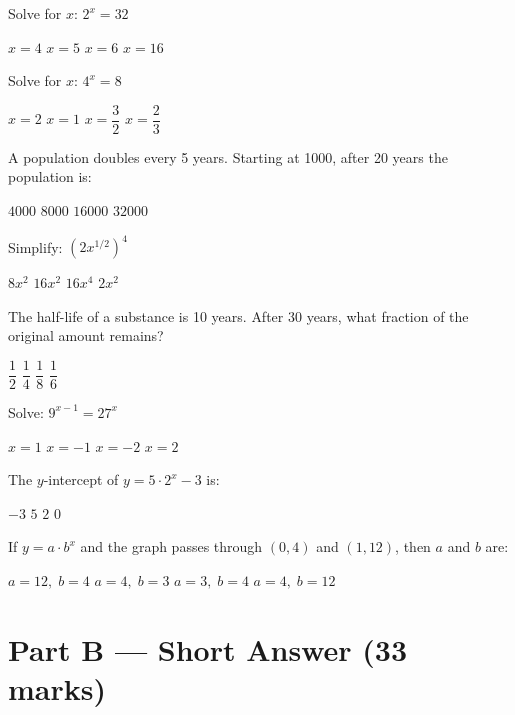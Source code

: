 \documentclass[addpoints]{exam}
\begin{document}
\begin{questions}
\question[1] Solve for $x$: $2^x = 32$
\begin{choices}
    \choice $x = 4$
    \correctchoice $x = 5$
    \choice $x = 6$
    \choice $x = 16$
\end{choices}

\question[1] Solve for $x$: $4^x = 8$
\begin{choices}
    \choice $x = 2$
    \choice $x = 1$
    \correctchoice $x = \dfrac{3}{2}$
    \choice $x = \dfrac{2}{3}$
\end{choices}

\question[1] A population doubles every 5 years. Starting at 1000, after 20 years the
population is:
\begin{choices}
    \choice $4000$
    \choice $8000$
    \correctchoice $16000$
    \choice $32000$
\end{choices}

\question[1] Simplify: $(2x^{1/2})^4$
\begin{choices}
    \choice $8x^2$
    \correctchoice $16x^2$
    \choice $16x^4$
    \choice $2x^2$
\end{choices}

\question[1] The half-life of a substance is 10 years. After 30 years, what fraction
of the original amount remains?
\begin{choices}
    \choice $\dfrac{1}{2}$
    \choice $\dfrac{1}{4}$
    \correctchoice $\dfrac{1}{8}$
    \choice $\dfrac{1}{6}$
\end{choices}

\question[1] Solve: $9^{x-1} = 27^x$
\begin{choices}
    \choice $x = 1$
    \choice $x = -1$
    \correctchoice $x = -2$
    \choice $x = 2$
\end{choices}

\question[1] The $y$-intercept of $y = 5 \cdot 2^x - 3$ is:
\begin{choices}
    \choice $-3$
    \choice $5$
    \correctchoice $2$
    \choice $0$
\end{choices}

\question[1] If $y = a \cdot b^x$ and the graph passes through $(0, 4)$ and $(1, 12)$,
then $a$ and $b$ are:
\begin{choices}
    \choice $a = 12,\; b = 4$
    \correctchoice $a = 4,\; b = 3$
    \choice $a = 3,\; b = 4$
    \choice $a = 4,\; b = 12$
\end{choices}


\section*{Part B --- Short Answer (33 marks)}


\end{questions}
\end{document}

